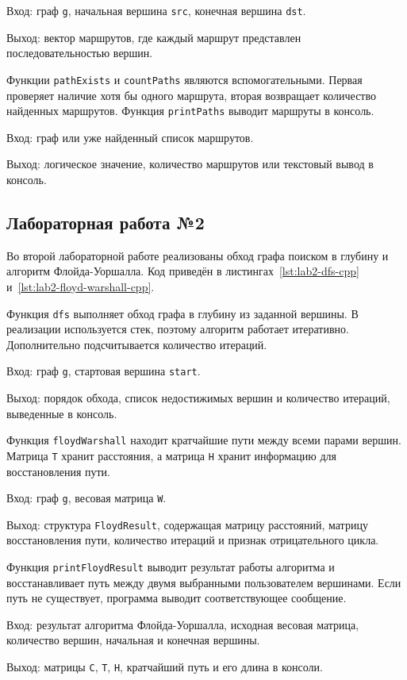 \documentclass[a4paper,final]{article}
\begin{document}
Вход: граф \texttt{g}, начальная вершина \texttt{src}, конечная вершина \texttt{dst}.

Выход: вектор маршрутов, где каждый маршрут представлен последовательностью вершин.

Функции \texttt{pathExists} и \texttt{countPaths} являются вспомогательными. Первая проверяет наличие хотя бы одного маршрута, вторая возвращает количество найденных маршрутов. Функция \texttt{printPaths} выводит маршруты в консоль.

Вход: граф или уже найденный список маршрутов.

Выход: логическое значение, количество маршрутов или текстовый вывод в консоль.

\subsection{Лабораторная работа №2}

Во второй лабораторной работе реализованы обход графа поиском в глубину и алгоритм Флойда-Уоршалла. Код приведён в листингах~\ref{lst:lab2-dfs-cpp} и~\ref{lst:lab2-floyd-warshall-cpp}.

Функция \texttt{dfs} выполняет обход графа в глубину из заданной вершины. В реализации используется стек, поэтому алгоритм работает итеративно. Дополнительно подсчитывается количество итераций.

Вход: граф \texttt{g}, стартовая вершина \texttt{start}.

Выход: порядок обхода, список недостижимых вершин и количество итераций, выведенные в консоль.

Функция \texttt{floydWarshall} находит кратчайшие пути между всеми парами вершин. Матрица \texttt{T} хранит расстояния, а матрица \texttt{H} хранит информацию для восстановления пути.

Вход: граф \texttt{g}, весовая матрица \texttt{W}.

Выход: структура \texttt{FloydResult}, содержащая матрицу расстояний, матрицу восстановления пути, количество итераций и признак отрицательного цикла.

Функция \texttt{printFloydResult} выводит результат работы алгоритма и восстанавливает путь между двумя выбранными пользователем вершинами. Если путь не существует, программа выводит соответствующее сообщение.

Вход: результат алгоритма Флойда-Уоршалла, исходная весовая матрица, количество вершин, начальная и конечная вершины.

Выход: матрицы \texttt{C}, \texttt{T}, \texttt{H}, кратчайший путь и его длина в консоли.
\end{document}
